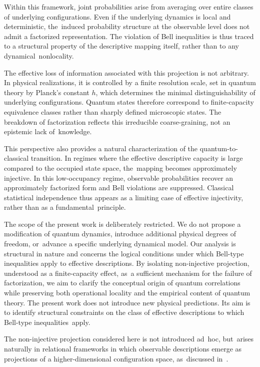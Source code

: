 \documentclass[quantumrep,article,accept,pdftex,oneauthor]{Definitions/mdpi}
\theoremstyle{remark}
\begin{document}
    Within this framework, joint probabilities arise from averaging over entire classes of
    underlying configurations.
    Even if the underlying dynamics is local and deterministic, the~induced probability
    structure at the observable level does not admit a factorized representation.
    The violation of Bell inequalities is thus traced to a structural property of the
    descriptive mapping itself, rather than to any dynamical~nonlocality.

    The effective loss of information associated with this projection is not arbitrary.
    In physical realizations, it is controlled by a finite resolution scale, set in quantum
    theory by Planck's constant \(h\), which determines the minimal distinguishability of
    underlying configurations.
    Quantum states therefore correspond to finite-capacity equivalence classes rather than
    sharply defined microscopic states.
    The breakdown of factorization reflects this irreducible coarse-graining, not an
    epistemic lack of~knowledge.

    This perspective also provides a natural characterization of the quantum-to-classical
    transition.
    In regimes where the effective descriptive capacity is large compared to the occupied
    state space, the~mapping becomes approximately injective.
    In this low-occupancy regime, observable probabilities recover an approximately
    factorized form and Bell violations are suppressed.
    Classical statistical independence thus appears as a limiting case of effective
    injectivity, rather than as a fundamental~principle.

    The scope of the present work is deliberately restricted.
    We do not propose a modification of quantum dynamics, introduce additional physical
    degrees of freedom, or~advance a specific underlying dynamical model.
    Our analysis is structural in nature and concerns the logical conditions under which
    Bell-type inequalities apply to effective descriptions.
    By isolating non-injective projection, understood as a finite-capacity effect, as~a
    sufficient mechanism for the failure of factorization, we aim to clarify the conceptual
    origin of quantum correlations while preserving both operational locality and the
    empirical content of quantum theory.
    The present work does not introduce new physical predictions.
    Its aim is to identify structural constraints on the class of effective
    descriptions to which Bell-type inequalities~apply.

    The non-injective projection considered here is not introduced ad~hoc, but~arises
    naturally in relational frameworks in which observable descriptions emerge as
    projections of a higher-dimensional configuration space, as~discussed
    in~\cite{Beau2026a}.
\end{document}
